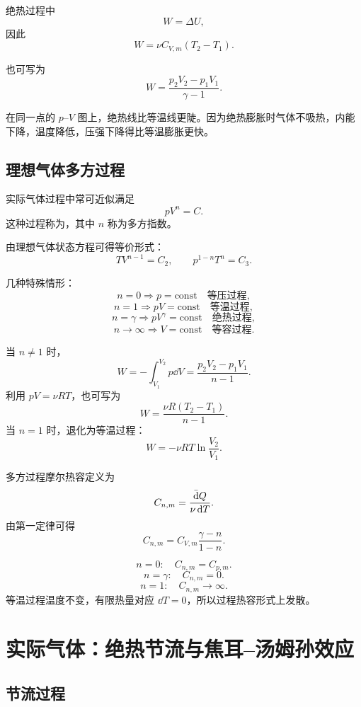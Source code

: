 绝热过程中
\[
  W=\Delta U,
\]
因此
\[
  \boxed{
  W=\nu C_{V,m}(T_2-T_1)
  }.
\]

也可写为
\[
  W=\frac{p_2V_2-p_1V_1}{\gamma-1}.
\]

\begin{WarnBox}[绝热线与等温线]
在同一点的 \(p\)--\(V\) 图上，绝热线比等温线更陡。因为绝热膨胀时气体不吸热，内能下降，温度降低，压强下降得比等温膨胀更快。
\end{WarnBox}

\subsection{理想气体多方过程}

实际气体过程中常可近似满足
\[
  \boxed{
  pV^n=C
  }.
\]
这种过程称为，其中 \(n\) 称为多方指数。

由理想气体状态方程可得等价形式：
\[
  \boxed{
  TV^{n-1}=C_2
  },
  \qquad
  \boxed{
  p^{1-n}T^n=C_3
  }.
\]

几种特殊情形：
\[
  n=0 \Rightarrow p=\mathrm{const}\quad\text{等压过程},
\]
\[
  n=1 \Rightarrow pV=\mathrm{const}\quad\text{等温过程},
\]
\[
  n=\gamma \Rightarrow pV^\gamma=\mathrm{const}\quad\text{绝热过程},
\]
\[
  n\to\infty \Rightarrow V=\mathrm{const}\quad\text{等容过程}.
\]

\begin{FormulaBox}[多方过程的功]
当 \(n\ne 1\) 时，
\[
  W=-\int_{V_1}^{V_2}p\dd V
  =
  \boxed{
  \frac{p_2V_2-p_1V_1}{n-1}
  }.
\]
利用 \(pV=\nu RT\)，也可写为
\[
  \boxed{
  W=\frac{\nu R(T_2-T_1)}{n-1}
  }.
\]
当 \(n=1\) 时，退化为等温过程：
\[
  W=-\nu RT\ln\frac{V_2}{V_1}.
\]
\end{FormulaBox}

多方过程摩尔热容定义为
\[
  C_{n,m}=\frac{\mathop{}\!\bar{\mathrm{d}} Q}{\nu\mathop{}\!\mathrm{d} T}.
\]
由第一定律可得
\[
  \boxed{
  C_{n,m}
  =
  C_{V,m}\frac{\gamma-n}{1-n}
  }.
\]

\begin{WarnBox}[多方热容的特殊值]
\[
  n=0:\quad C_{n,m}=C_{p,m}.
\]
\[
  n=\gamma:\quad C_{n,m}=0.
\]
\[
  n=1:\quad C_{n,m}\to\infty.
\]
等温过程温度不变，有限热量对应 \(\dd T=0\)，所以过程热容形式上发散。
\end{WarnBox}

\section{实际气体：绝热节流与焦耳--汤姆孙效应}

\subsection{节流过程}

